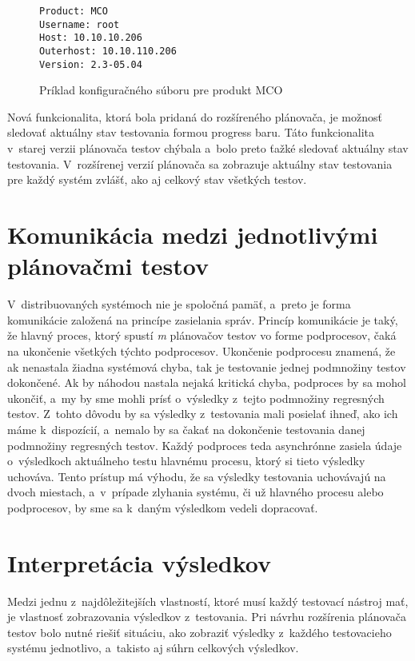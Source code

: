 \begin{figure}[h]
\begin{lstlisting}
Product: MCO
Username: root
Host: 10.10.10.206
Outerhost: 10.10.110.206
Version: 2.3-05.04
\end{lstlisting}
\caption{Príklad konfiguračného súboru pre produkt MCO}
\label{obrazok:priklad_konfig_suboru}
\end{figure}

Nová funkcionalita, ktorá bola pridaná do rozšíreného plánovača, je 
možnosť sledovať aktuálny stav testovania formou progress baru. 
Táto funkcionalita v~starej verzii plánovača testov chýbala a~bolo 
preto ťažké sledovať aktuálny stav testovania. 
V~rozšírenej verzií plánovača sa zobrazuje aktuálny stav testovania pre 
každý systém zvlášť, ako aj celkový stav všetkých testov.

\section{Komunikácia medzi jednotlivými plánovačmi testov}
\label{sekcia:komunikacia}
V~distribuovaných systémoch nie je spoločná pamäť, a~preto je forma 
komunikácie založená na princípe zasielania správ.
Princíp komunikácie je taký, že hlavný proces, ktorý spustí \emph{m} 
plánovačov testov vo forme podprocesov, čaká na ukončenie
všetkých týchto podprocesov. Ukončenie podprocesu znamená, že ak 
nenastala žiadna systémová chyba, tak je testovanie jednej podmnožiny 
testov dokončené. Ak by náhodou nastala nejaká kritická chyba, 
podproces by sa mohol ukončiť, a~my by sme mohli prísť o~výsledky 
z~tejto podmnožiny regresných testov. Z~tohto dôvodu by sa výsledky 
z~testovania mali posielať ihneď, ako ich máme k~dispozícií,
a~nemalo by sa čakať na dokončenie testovania danej podmnožiny 
regresných testov. Každý podproces teda asynchrónne zasiela údaje 
o~výsledkoch aktuálneho testu hlavnému procesu, ktorý si tieto výsledky 
uchováva. Tento prístup má výhodu, že sa výsledky testovania uchovávajú 
na dvoch miestach, a~v~prípade zlyhania systému, či už hlavného procesu 
alebo podprocesov, by sme sa k~daným výsledkom vedeli dopracovať. 


\section{Interpretácia výsledkov}
\label{sekcia:interpretacia_vysledkov}
Medzi jednu z~najdôležitejších vlastností, ktoré musí každý testovací 
nástroj mať, je vlastnosť zobrazovania výsledkov z~testovania.
Pri návrhu rozšírenia plánovača testov bolo nutné riešiť situáciu, 
ako zobraziť výsledky z~každého testovacieho systému jednotlivo,
a~takisto aj súhrn celkových výsledkov. 

